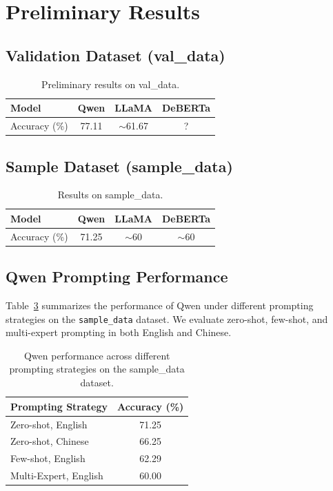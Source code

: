 \documentclass[11pt]{article}
\begin{document}
\section{Preliminary Results}

\subsection{Validation Dataset (val\_data)}

\begin{table}[H]
\centering
\begin{tabular}{lccc}
\toprule
Model & Qwen & LLaMA & DeBERTa \\
\midrule
Accuracy (\%) & 77.11 & $\sim$61.67 & ? \\
\bottomrule
\end{tabular}
\caption{Preliminary results on val\_data.}
\label{tab:val-results}
\end{table}

\subsection{Sample Dataset (sample\_data)}

\begin{table}[H]
\centering
\begin{tabular}{lccc}
\toprule
Model & Qwen & LLaMA & DeBERTa \\
\midrule
Accuracy (\%) & 71.25 & $\sim$60 & $\sim$60 \\
\bottomrule
\end{tabular}
\caption{Results on sample\_data.}
\label{tab:sample-results}
\end{table}

\subsection{Qwen Prompting Performance}

Table~\ref{tab:qwen-prompting} summarizes the performance of Qwen under different prompting strategies on the \texttt{sample\_data} dataset. We evaluate zero-shot, few-shot, and multi-expert prompting in both English and Chinese.

\begin{table}[H]
\centering
\begin{tabular}{l c}
\toprule
Prompting Strategy & Accuracy (\%) \\
\midrule
Zero-shot, English & 71.25 \\
Zero-shot, Chinese & 66.25 \\
Few-shot, English & 62.29 \\
Multi-Expert, English & 60.00 \\
\bottomrule
\end{tabular}
\caption{Qwen performance across different prompting strategies on the sample\_data dataset.}
\label{tab:qwen-prompting}
\end{table}
\end{document}
